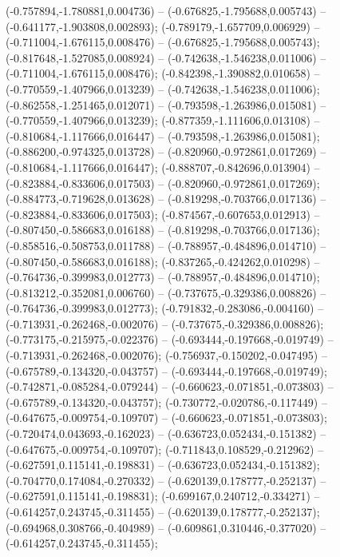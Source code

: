  (-0.757894,-1.780881,0.004736) -- (-0.676825,-1.795688,0.005743) -- (-0.641177,-1.903808,0.002893);
 (-0.789179,-1.657709,0.006929) -- (-0.711004,-1.676115,0.008476) -- (-0.676825,-1.795688,0.005743);
 (-0.817648,-1.527085,0.008924) -- (-0.742638,-1.546238,0.011006) -- (-0.711004,-1.676115,0.008476);
 (-0.842398,-1.390882,0.010658) -- (-0.770559,-1.407966,0.013239) -- (-0.742638,-1.546238,0.011006);
 (-0.862558,-1.251465,0.012071) -- (-0.793598,-1.263986,0.015081) -- (-0.770559,-1.407966,0.013239);
 (-0.877359,-1.111606,0.013108) -- (-0.810684,-1.117666,0.016447) -- (-0.793598,-1.263986,0.015081);
 (-0.886200,-0.974325,0.013728) -- (-0.820960,-0.972861,0.017269) -- (-0.810684,-1.117666,0.016447);
 (-0.888707,-0.842696,0.013904) -- (-0.823884,-0.833606,0.017503) -- (-0.820960,-0.972861,0.017269);
 (-0.884773,-0.719628,0.013628) -- (-0.819298,-0.703766,0.017136) -- (-0.823884,-0.833606,0.017503);
 (-0.874567,-0.607653,0.012913) -- (-0.807450,-0.586683,0.016188) -- (-0.819298,-0.703766,0.017136);
 (-0.858516,-0.508753,0.011788) -- (-0.788957,-0.484896,0.014710) -- (-0.807450,-0.586683,0.016188);
 (-0.837265,-0.424262,0.010298) -- (-0.764736,-0.399983,0.012773) -- (-0.788957,-0.484896,0.014710);
 (-0.813212,-0.352081,0.006760) -- (-0.737675,-0.329386,0.008826) -- (-0.764736,-0.399983,0.012773);
 (-0.791832,-0.283086,-0.004160) -- (-0.713931,-0.262468,-0.002076) -- (-0.737675,-0.329386,0.008826);
 (-0.773175,-0.215975,-0.022376) -- (-0.693444,-0.197668,-0.019749) -- (-0.713931,-0.262468,-0.002076);
 (-0.756937,-0.150202,-0.047495) -- (-0.675789,-0.134320,-0.043757) -- (-0.693444,-0.197668,-0.019749);
 (-0.742871,-0.085284,-0.079244) -- (-0.660623,-0.071851,-0.073803) -- (-0.675789,-0.134320,-0.043757);
 (-0.730772,-0.020786,-0.117449) -- (-0.647675,-0.009754,-0.109707) -- (-0.660623,-0.071851,-0.073803);
 (-0.720474,0.043693,-0.162023) -- (-0.636723,0.052434,-0.151382) -- (-0.647675,-0.009754,-0.109707);
 (-0.711843,0.108529,-0.212962) -- (-0.627591,0.115141,-0.198831) -- (-0.636723,0.052434,-0.151382);
 (-0.704770,0.174084,-0.270332) -- (-0.620139,0.178777,-0.252137) -- (-0.627591,0.115141,-0.198831);
 (-0.699167,0.240712,-0.334271) -- (-0.614257,0.243745,-0.311455) -- (-0.620139,0.178777,-0.252137);
 (-0.694968,0.308766,-0.404989) -- (-0.609861,0.310446,-0.377020) -- (-0.614257,0.243745,-0.311455);
